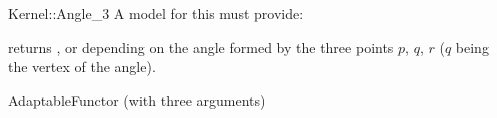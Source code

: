 \begin{ccRefFunctionObjectConcept}{Kernel::Angle_3}
A model for this must provide:


{returns ,  or  depending
on the angle formed by the three points $p$, $q$, $r$ ($q$ being the vertex of
the angle).}

\ccRefines
AdaptableFunctor (with three arguments)

\ccSeeAlso
{} \\

\end{ccRefFunctionObjectConcept}
